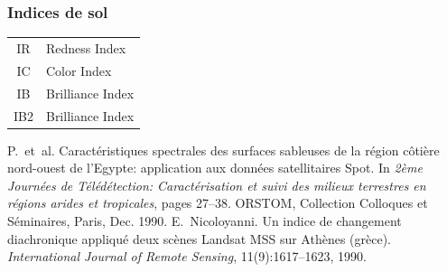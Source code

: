 \documentclass[compress,handout]{beamer}
\begin{document}
\begin{frame}
\frametitle{Indices de sol}
\footnotesize \centering
\begin{tabular}{|c|l|}
\hline
IR  & Redness Index  \cite{Pouget1990-IRIC} \\
IC  & Color Index  \cite{Pouget1990-IRIC} \\
IB  & Brilliance Index  \cite{Nicoloyanni1990-IB} \\
IB2 & Brilliance Index  \cite{Nicoloyanni1990-IB} \\
\hline
\end{tabular}
\begin{thebibliography}{noidea}
\tiny
{}
P.~et~al.
 Caractéristiques spectrales des surfaces sableuses de la région
  côtière nord-ouest de l'{E}gypte: application aux données satellitaires
  {S}pot.
 In {\em 2ème Journées de Télédétection: Caractérisation et suivi des
  milieux terrestres en régions arides et tropicales}, pages 27--38. ORSTOM,
  Collection Colloques et Séminaires, Paris, Dec. 1990.
E.~Nicoloyanni.
 Un indice de changement diachronique appliqu\'e deux sc\`enes
  {L}andsat {MSS} sur {A}th\`enes (gr\`ece).
 {\em International Journal of Remote Sensing}, 11(9):1617--1623,
  1990.
\end{thebibliography}
\end{frame}
\end{document}
